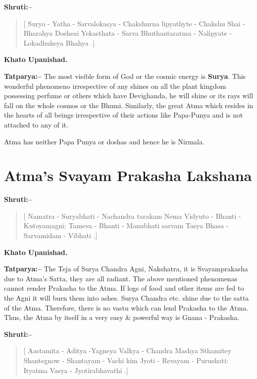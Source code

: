 \textbf{Shruti:–}

\begin{verse}
[ Suryo - Yatha - Sarvalokasya - Chakshurna lipyathyte - Chakshu Shai - Bharahya Dosheai  Yekasthata - Sarva Bhuthantaratma - Nalipyate - Lokadhukeya Bhahya .]
\end{verse}

\begin{flushright}
\textbf{Khato Upanishad.}
\end{flushright}

\textbf{Tatparya:–} The most visible form of God or the cosmic energy is \textbf{Surya}. This wonderful phenomeno irrespective of any shines on all the plant kingdom possessing perfume or others which have Devighanda, he will shine or its rays will fall on the whole cosmos or the Bhumi. Similarly, the great Atma which resides in the hearts of all beings irrespective of their actions like Papa-Punya and is not attached to any of it.

Atma has neither Papa Punya or doshas and hence he is Nirmala.

\chapter{Atma's Svayam Prakasha Lakshana}

\textbf{Shruti:–}

\begin{verse}
[ Namatra - Suryabhati - Nachandra tarakam  Nema Vidyuto - Bhanti - Kutoyamagni:  Tameva - Bhanti - Manubhati sarvam  Tasya Bhasa - Sarvamidam - Vibhati .]
\end{verse}

\begin{flushright}
\textbf{Khato Upanishad.}
\end{flushright}

\textbf{Tatparya:–} The Teja of Surya Chandra Agni, Nakshatra, it is Svayamprakasha due to Atma's Satta, they are all radiant. The above mentioned phenomenas cannot render Prakasha to the Atma. If logs of food and other items are fed to the Agni it will burn them into ashes. Surya Chandra etc. shine due to the satta of the Atma. Therefore, there is no vastu which can lend Prakasha to the Atma. Thus, the Atma by itself in a very easy \& powerful way is Gnana - Prakasha.

\textbf{Shruti:–}

\begin{verse}
[ Aastamita - Aditya -Yagneya Valkya - Chandra Mashya Sthamitey Shantegnow - Shantayam - Vachi  kim Jyoti - Revayam - Purushati:  Ityatma Vasya - Jyotirabhavathi .]
\end{verse}

